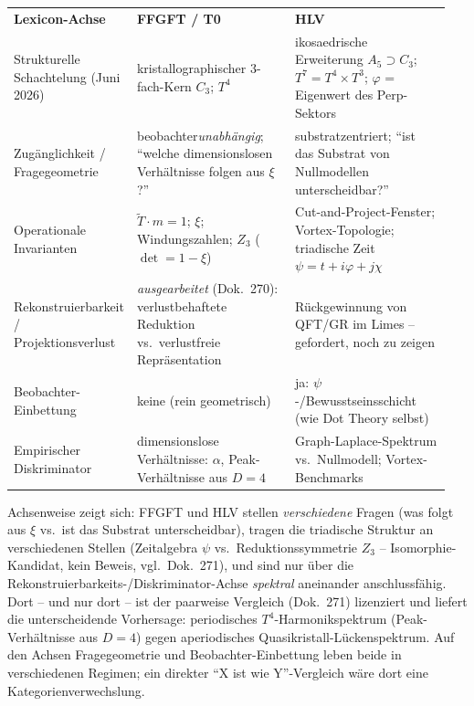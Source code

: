 \begin{center}
\small
\begin{tabular}{@{}p{0.17\linewidth}p{0.39\linewidth}p{0.39\linewidth}@{}}
\hline
\textbf{Lexicon-Achse} & \textbf{FFGFT / T0} & \textbf{HLV}\\
Strukturelle Schachtelung (Juni 2026)
& kristallographischer $3$-fach-Kern $C_3$; $T^4$
& ikosaedrische Erweiterung $A_5\supset C_3$; $T^7=T^4{\times}T^3$; $\varphi$ = Eigenwert des Perp-Sektors\\
\hline
Zugänglichkeit / Fragegeometrie
& beobachter\emph{unabhängig}; \enquote{welche dimensionslosen Verhältnisse folgen aus $\xi$?}
& substratzentriert; \enquote{ist das Substrat von Nullmodellen unterscheidbar?}\\
Operationale Invarianten
& $\tilde T\cdot m=1$; $\xi$; Windungszahlen; $Z_3$ ($\det=1-\xi$)
& Cut-and-Project-Fenster; Vortex-Topologie; triadische Zeit $\psi=t+i\varphi+j\chi$\\
Rekonstruierbarkeit / Projektionsverlust
& \emph{ausgearbeitet} (Dok.~270): verlustbehaftete Reduktion vs.\ verlustfreie Repräsentation
& Rückgewinnung von QFT/GR im Limes -- gefordert, noch zu zeigen\\
Beobachter-Einbettung
& keine (rein geometrisch)
& ja: $\psi$-/Bewusstseinsschicht (wie Dot Theory selbst)\\
Empirischer Diskriminator
& dimensionslose Verhältnisse: $\alpha$, Peak-Verhältnisse aus $D=4$
& Graph-Laplace-Spektrum vs.\ Nullmodell; Vortex-Benchmarks\\
\hline
\end{tabular}
\end{center}

Achsenweise zeigt sich: FFGFT und HLV stellen \emph{verschiedene} Fragen (was folgt aus $\xi$ vs.\ ist das
Substrat unterscheidbar), tragen die triadische Struktur an verschiedenen Stellen (Zeitalgebra $\psi$ vs.\
Reduktionssymmetrie $Z_3$ -- Isomorphie-Kandidat, kein Beweis, vgl.\ Dok.~271), und sind nur über die
Rekonstruierbarkeits-/Diskriminator-Achse \emph{spektral} aneinander anschlussfähig. Dort -- und nur dort --
ist der paarweise Vergleich (Dok.~271) lizenziert und liefert die unterscheidende Vorhersage: periodisches
$T^4$-Harmonik\-spektrum (Peak-Verhältnisse aus $D=4$) gegen aperiodisches Quasikristall-Lückenspektrum.
Auf den Achsen Fragegeometrie und Beobachter-Einbettung leben beide in verschiedenen Regimen; ein direkter
\enquote{X ist wie Y}-Vergleich wäre dort eine Kategorienverwechslung.

